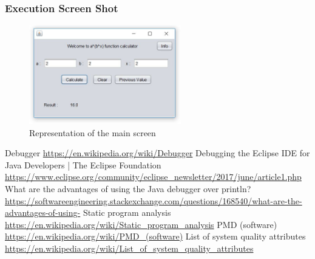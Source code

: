 \documentclass[a4paper, 11pt]{article}
\begin{document}
\subsubsection{Execution Screen Shot}

\begin{figure}[h]
\caption{Representation of the main screen}
\centering
\includegraphics[width=0.59\textwidth]{screenshot.JPG}
\end{figure}

\newpage
\begin{thebibliography}{}
Debugger
\url{https://en.wikipedia.org/wiki/Debugger}
Debugging the Eclipse IDE for Java Developers | The Eclipse Foundation
\url{https://www.eclipse.org/community/eclipse_newsletter/2017/june/article1.php}
What are the advantages of using the Java debugger over println?
\url{https://softwareengineering.stackexchange.com/questions/168540/what-are-the-advantages-of-using-}
Static program analysis
\url{https://en.wikipedia.org/wiki/Static_program_analysis}
PMD (software)
\url{https://en.wikipedia.org/wiki/PMD_(software)}
List of system quality attributes
\url{https://en.wikipedia.org/wiki/List_of_system_quality_attributes}

\end{thebibliography}
\end{document}
